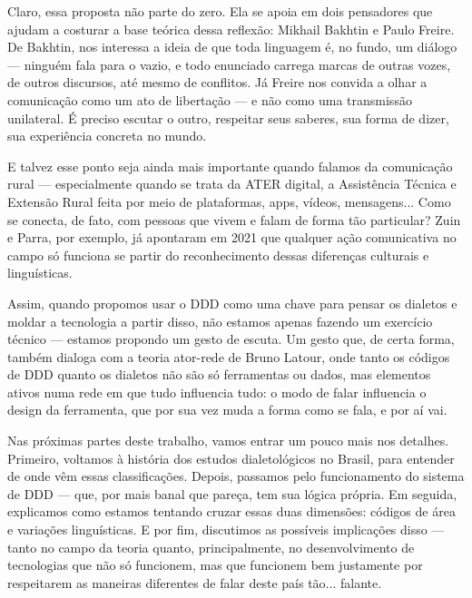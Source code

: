 \begin{flushleft}
Claro, essa proposta não parte do zero. Ela se apoia em dois pensadores que ajudam a costurar a base teórica dessa reflexão: Mikhail Bakhtin e Paulo Freire. De Bakhtin, nos interessa a ideia de que toda linguagem é, no fundo, um diálogo — ninguém fala para o vazio, e todo enunciado carrega marcas de outras vozes, de outros discursos, até mesmo de conflitos. Já Freire nos convida a olhar a comunicação como um ato de libertação — e não como uma transmissão unilateral. É preciso escutar o outro, respeitar seus saberes, sua forma de dizer, sua experiência concreta no mundo.

E talvez esse ponto seja ainda mais importante quando falamos da comunicação rural — especialmente quando se trata da ATER digital, a Assistência Técnica e Extensão Rural feita por meio de plataformas, apps, vídeos, mensagens... Como se conecta, de fato, com pessoas que vivem e falam de forma tão particular? Zuin e Parra, por exemplo, já apontaram em 2021 que qualquer ação comunicativa no campo só funciona se partir do reconhecimento dessas diferenças culturais e linguísticas.

Assim, quando propomos usar o DDD como uma chave para pensar os dialetos e moldar a tecnologia a partir disso, não estamos apenas fazendo um exercício técnico — estamos propondo um gesto de escuta. Um gesto que, de certa forma, também dialoga com a teoria ator-rede de Bruno Latour, onde tanto os códigos de DDD quanto os dialetos não são só ferramentas ou dados, mas elementos ativos numa rede em que tudo influencia tudo: o modo de falar influencia o design da ferramenta, que por sua vez muda a forma como se fala, e por aí vai.

Nas próximas partes deste trabalho, vamos entrar um pouco mais nos detalhes. Primeiro, voltamos à história dos estudos dialetológicos no Brasil, para entender de onde vêm essas classificações. Depois, passamos pelo funcionamento do sistema de DDD — que, por mais banal que pareça, tem sua lógica própria. Em seguida, explicamos como estamos tentando cruzar essas duas dimensões: códigos de área e variações linguísticas. E por fim, discutimos as possíveis implicações disso — tanto no campo da teoria quanto, principalmente, no desenvolvimento de tecnologias que não só funcionem, mas que funcionem bem justamente por respeitarem as maneiras diferentes de falar deste país tão... falante.


	
\end{flushleft}



